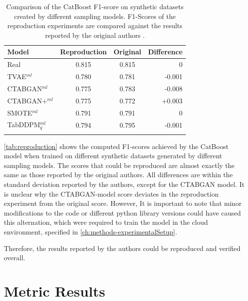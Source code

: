 \begin{table}[h]
	\centering
	\begin{tabular}{lccr}
		\toprule
		\textbf{Model}     & \textbf{Reproduction} & \textbf{Original} & \textbf{Difference} \\
		\midrule
		Real               & 0.815                 & 0.815             & 0                   \\
		TVAE$^{ml}$        & 0.780                 & 0.781             & -0.001              \\
		CTABGAN$^{ml}$     & 0.775                 & 0.783             & -0.008              \\
		CTABGAN+$^{ml}$    & 0.775                 & 0.772             & +0.003              \\
		SMOTE$^{ml}$       & 0.791                 & 0.791             & 0                   \\
		TabDDPM$^{ml}_{q}$ & 0.794                 & 0.795             & -0.001              \\
		\bottomrule
		\multicolumn{4}{c}{}\\[-0.6em]
	\end{tabular}
	\caption[Reproduction Original Results]{Comparison of the CatBoost F1-score on synthetic datasets created by different sampling models.
		F1-Scores of the reproduction experiments are compared against the results reported by the original authors \cite[Table 4, p. 8]{kotelnikov2022TabDDPMModellingTabular}.}
	\label{tab:reproduction}
\end{table}

\autoref{tab:reproduction} shows the computed F1-scores achieved by the CatBoost model when trained on different synthetic datasets generated by different sampling models.
The scores that could be reproduced are almost exactly the same as those reported by the original authors.
All differences are within the standard deviation reported by the authors, except for the CTABGAN model.
It is unclear why the CTABGAN-model score deviates in the reproduction experiment from the original score.
However, It is important to note that minor modifications to the code or different python library versions could have caused this alternation, which were required to train the model in the cloud environment, specified in \autoref{ch:methods-experimentalSetup}.

Therefore, the results reported by the authors could be reproduced and verified overall.

\section{Metric Results}
\label{ch:results-Metric-results}

